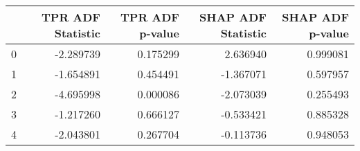\begin{tabular}{lrrrr}
\toprule
 & TPR ADF Statistic & TPR ADF p-value & SHAP ADF Statistic & SHAP ADF p-value \\
\midrule
0 & -2.289739 & 0.175299 & 2.636940 & 0.999081 \\
1 & -1.654891 & 0.454491 & -1.367071 & 0.597957 \\
2 & -4.695998 & 0.000086 & -2.073039 & 0.255493 \\
3 & -1.217260 & 0.666127 & -0.533421 & 0.885328 \\
4 & -2.043801 & 0.267704 & -0.113736 & 0.948053 \\
\bottomrule
\end{tabular}

